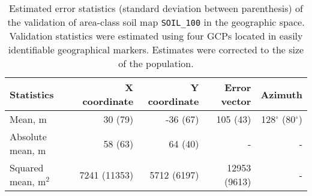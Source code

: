 \begin{table}[ht]
  \caption{Estimated error statistics (standard deviation between parenthesis) of the validation of area-class soil map \texttt{SOIL\_100} in the geographic space. Validation statistics were estimated using four GCPs located in easily identifiable geographical markers. Estimates were corrected to the size of the population.}
  \label{tab:soil-geo-val}
  \centering
  {\small
  \begin{tabular}{lrrrr}
    \hline
    Statistics           & X coordinate & Y coordinate & Error vector & Azimuth                  \\
    \hline
    Mean, m              & 30   (79)    & -36  (67)    & 105   (43)   & 128$^\circ$ (80$^\circ$) \\ 
    Absolute mean, m     & 58   (63)    & 64   (40)    & -            & -                        \\ 
    Squared mean, m$^2$  & 7241 (11353) & 5712 (6197)  & 12953 (9613) & -                        \\ 
    \hline
  \end{tabular}}
\end{table}


